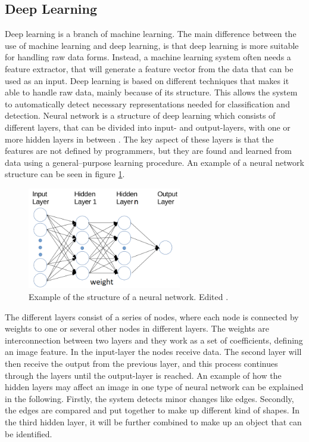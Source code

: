 \subsection{Deep Learning}
Deep learning is a branch of machine learning. The main difference between the use of machine learning and deep learning, is that deep learning is more suitable for handling raw data forms. Instead, a machine learning system often needs a feature extractor, that will generate a feature vector from the data that can be used as an input.
Deep learning is based on different techniques that makes it able to handle raw data, mainly because of its structure.\citep{LeCun2015, Schmidhuber2015} This allows the system to automatically detect necessary representations needed for classification and detection. \newline
Neural network is a structure of deep learning which consists of different layers, that can be divided into input- and output-layers, with one or more hidden layers in between \citep{Schmidhuber2015}. The key aspect of these layers is that the features are not defined by programmers, but they are found and learned from data using a general–purpose learning procedure.\citep{LeCun2015} An example of a neural network structure can be seen in figure \ref{fig:NN_structure}.   

\begin{figure} [H]
\centering
\includegraphics[width=0.6\textwidth]{figures/NN_structure}
\caption{Example of the structure of a neural network. Edited \citep{Acquarelli2017}.}
\label{fig:NN_structure}  
\end{figure}

\noindent
The different layers consist of a series of nodes, where each node is connected by weights to one or several other nodes in different layers. The weights  are interconnection between two layers and they work as a set of coefficients, defining an image feature\citep{Hameed2016}. In the input-layer the nodes receive data. The second layer will then receive the output from the previous layer, and this process continues through the layers until the output-layer is reached.\citep{Schmidhuber2015} An example of how the hidden layers may affect an image in one type of neural network can be explained in the following.  
Firstly, the system detects minor changes like edges. Secondly, the edges are compared and put together to make up different kind of shapes. In the third hidden layer, it will be further combined to make up an object that can be identified.\citep{LeCun2015}

